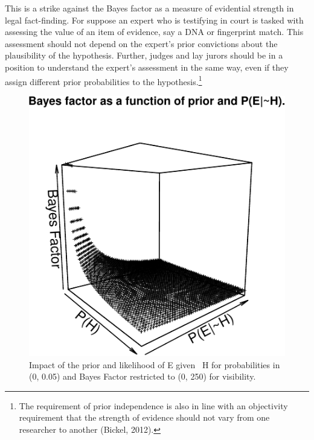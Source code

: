 \documentclass[
  10pt,
  dvipsnames,enabledeprecatedfontcommands]{scrartcl}
\begin{document}
This is a strike against the Bayes factor as a measure of evidential
strength in legal fact-finding. For suppose an expert who is testifying
in court is tasked with assessing the value of an item of evidence, say
a DNA or fingerprint match. This assessment should not depend on the
expert's prior convictions about the plausibility of the hypothesis.
Further, judges and lay jurors should be in a position to understand the
expert's assessment in the same way, even if they assign different prior
probabilities to the hypothesis.\footnote{The requirement of prior
  independence is also in line with an objectivity requirement that the
  strength of evidence should not vary from one researcher to another
  (Bickel, 2012).}

\footnotesize

\normalsize

\begin{figure}


\begin{center}\includegraphics[width=1\linewidth]{lr-chapter4_files/figure-latex/fig-BayesFactorPrior-1} \end{center}
\caption{Impact of the prior and likelihood of E given ~H for probabilities in (0, 0.05) and Bayes Factor restricted to (0, 250) for visibility.}
\label{fig:BayesFactorPrior}
\end{figure}
\end{document}
